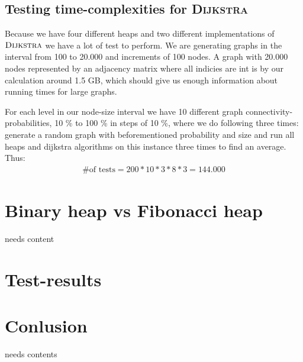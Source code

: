 \documentclass[oneside,11pt,openright]{report}
\newcommand{\Dijkstra}{\textsc{Dijkstra}}
\begin{document}
\section{Testing time-complexities for \Dijkstra}

Because we have four different heaps and two different implementations of $\Dijkstra$ we have a lot of test to perform. We are generating graphs in the interval from 100 to 20.000 and increments of 100 nodes. A graph with 20.000 nodes represented by an adjacency matrix where all indicies are int is by our calculation around 1.5 GB, which should give us enough information about running times for large graphs.

For each level in our node-size interval we have 10 different graph connectivity-probabilities, 10 \% to 100 \% in steps of 10 \%, where we do following three times: generate a random graph with beforementioned probability and size and run all heaps and dijkstra algorithms on this instance three times to find an average. Thus:
\begin{align*}
    \text{\# of tests} = 200 * 10 * 3 * 8 * 3 = 144.000 
 \end{align*}



\chapter{Binary heap vs Fibonacci heap}

needs content

\chapter{Test-results}













\chapter{Conlusion}

needs contents



 

\end{document}
